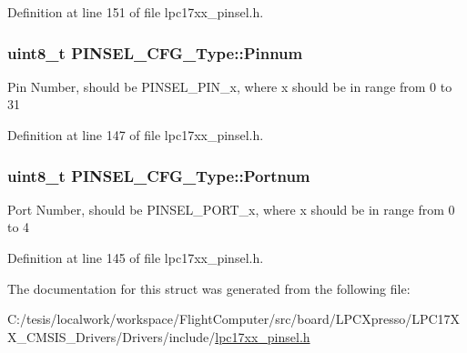 \-Definition at line 151 of file lpc17xx\-\_\-pinsel.\-h.

\hypertarget{struct_p_i_n_s_e_l___c_f_g___type_a6d439a871adb445a571aa28806593532}{
\subsubsection[{\-Pinnum}]{\setlength{\rightskip}{0pt plus 5cm}uint8\-\_\-t {\bf \-P\-I\-N\-S\-E\-L\-\_\-\-C\-F\-G\-\_\-\-Type\-::\-Pinnum}}}\label{struct_p_i_n_s_e_l___c_f_g___type_a6d439a871adb445a571aa28806593532}
\-Pin \-Number, should be \-P\-I\-N\-S\-E\-L\-\_\-\-P\-I\-N\-\_\-x, where x should be in range from 0 to 31 

\-Definition at line 147 of file lpc17xx\-\_\-pinsel.\-h.

\hypertarget{struct_p_i_n_s_e_l___c_f_g___type_a6b754912548dadd6634bb39c8b760fd1}{
\subsubsection[{\-Portnum}]{\setlength{\rightskip}{0pt plus 5cm}uint8\-\_\-t {\bf \-P\-I\-N\-S\-E\-L\-\_\-\-C\-F\-G\-\_\-\-Type\-::\-Portnum}}}\label{struct_p_i_n_s_e_l___c_f_g___type_a6b754912548dadd6634bb39c8b760fd1}
\-Port \-Number, should be \-P\-I\-N\-S\-E\-L\-\_\-\-P\-O\-R\-T\-\_\-x, where x should be in range from 0 to 4 

\-Definition at line 145 of file lpc17xx\-\_\-pinsel.\-h.



\-The documentation for this struct was generated from the following file\-:\begin{DoxyCompactItemize}
\item 
\-C\-:/tesis/localwork/workspace/\-Flight\-Computer/src/board/\-L\-P\-C\-Xpresso/\-L\-P\-C17\-X\-X\-\_\-\-C\-M\-S\-I\-S\-\_\-\-Drivers/\-Drivers/include/\hyperlink{lpc17xx__pinsel_8h}{lpc17xx\-\_\-pinsel.\-h}\end{DoxyCompactItemize}
